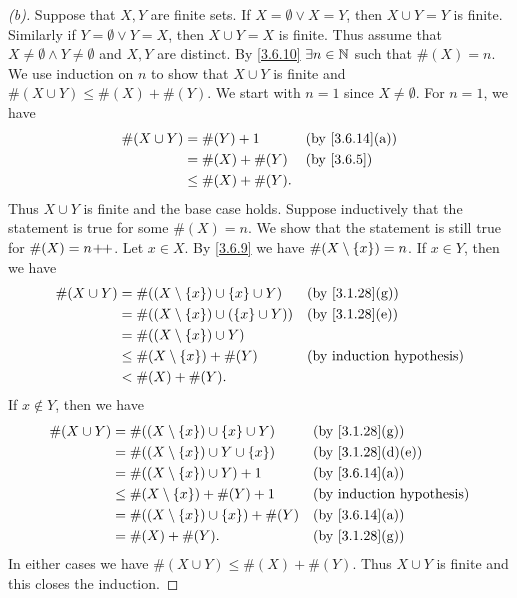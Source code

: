 \begin{proof}[(b)]
	Suppose that \(X, Y\) are finite sets.
	If \(X = \emptyset \lor X = Y\), then \(X \cup Y = Y\) is finite.
	Similarly if \(Y = \emptyset \lor Y = X\), then \(X \cup Y = X\) is finite.
	Thus assume that \(X \neq \emptyset \land Y \neq \emptyset\) and \(X, Y\) are distinct.
	By \cref{3.6.10} \(\exists n \in \mathbb{N}\) such that \(\#(X) = n\).
	We use induction on \(n\) to show that \(X \cup Y\) is finite and \(\#(X \cup Y) \leq \#(X) + \#(Y)\).
	We start with \(n = 1\) since \(X \neq \emptyset\).
	For \(n = 1\), we have
	\begin{align*}
		\#(X \cup Y) & = \#(Y) + 1         &  & \text{(by \cref{3.6.14}(a))} \\
		             & = \#(X) + \#(Y)     &  & \by{3.6.5}                   \\
		             & \leq \#(X) + \#(Y).
	\end{align*}
	Thus \(X \cup Y\) is finite and the base case holds.
	Suppose inductively that the statement is true for some \(\#(X) = n\).
	We show that the statement is still true for \(\#(X) = n\!+\!\!+\).
	Let \(x \in X\).
	By \cref{3.6.9} we have \(\#(X \setminus \left\lbrace x\right\rbrace) = n\).
	If \(x \in Y\), then we have
	\begin{align*}
		\#(X \cup Y) & = \#((X \setminus \set{x}) \cup \set{x} \cup Y)   &  & \text{(by \cref{3.1.28}(g))} \\
		             & = \#((X \setminus \set{x}) \cup (\set{x} \cup Y)) &  & \text{(by \cref{3.1.28}(e))} \\
		             & = \#((X \setminus \set{x}) \cup Y)                                                  \\
		             & \leq \#(X \setminus \set{x}) + \#(Y)              &  & \byIH                        \\
		             & < \#(X) + \#(Y).
	\end{align*}
	If \(x \notin Y\), then we have
	\begin{align*}
		\#(X \cup Y) & = \#((X \setminus \set{x}) \cup \set{x} \cup Y)  &  & \text{(by \cref{3.1.28}(g))}    \\
		             & = \#((X \setminus \set{x}) \cup Y \cup \set{x})  &  & \text{(by \cref{3.1.28}(d)(e))} \\
		             & = \#((X \setminus \set{x}) \cup Y) + 1           &  & \text{(by \cref{3.6.14}(a))}    \\
		             & \leq \#(X \setminus \set{x}) + \#(Y) + 1         &  & \byIH                           \\
		             & = \#((X \setminus \set{x}) \cup \set{x}) + \#(Y) &  & \text{(by \cref{3.6.14}(a))}    \\
		             & = \#(X) + \#(Y).                                 &  & \text{(by \cref{3.1.28}(g))}
	\end{align*}
	In either cases we have \(\#(X \cup Y) \leq \#(X) + \#(Y)\).
	Thus \(X \cup Y\) is finite and this closes the induction.


\end{proof}
